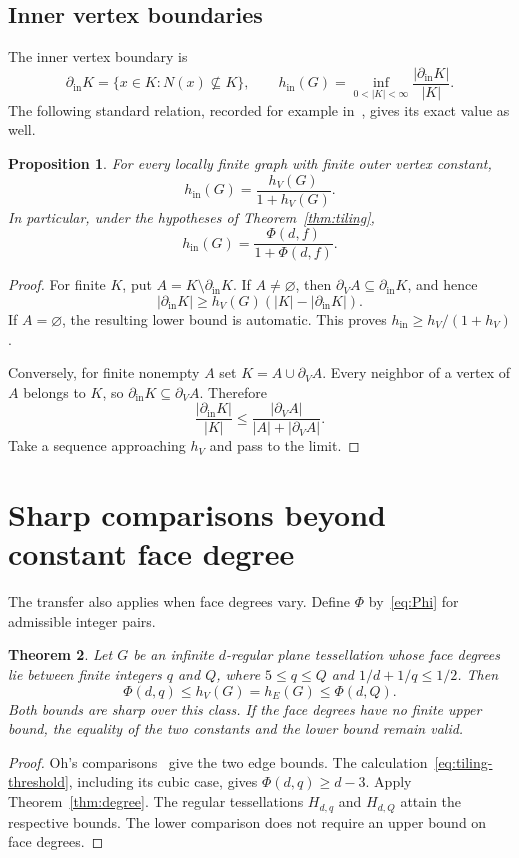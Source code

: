 \documentclass[11pt]{amsart}
\numberwithin{equation}{section}
\newtheorem{theorem}{Theorem}[section]
\newtheorem{proposition}[theorem]{Proposition}
\theoremstyle{definition}
\theoremstyle{remark}
\newcommand{\hE}{h_E}
\newcommand{\hV}{h_V}
\newcommand{\hI}{h_{\mathrm{in}}}
\newcommand{\bV}{\partial_V}
\newcommand{\bI}{\partial_{\mathrm{in}}}
\begin{document}
\subsection{Inner vertex boundaries}
The inner vertex boundary is
\[
\bI K=\{x\in K:N(x)\not\subseteq K\},\qquad
\hI(G)=\inf_{0<|K|<\infty}\frac{|\bI K|}{|K|}.
\]
The following standard relation, recorded for example in~\cite[Section~7]{Oh}, gives its exact value as well.

\begin{proposition}\label{prop:inner}
For every locally finite graph with finite outer vertex constant,
\[
\hI(G)=\frac{\hV(G)}{1+\hV(G)}.
\]
In particular, under the hypotheses of Theorem~\ref{thm:tiling},
\[
\hI(G)=\frac{\Phi(d,f)}{1+\Phi(d,f)}.
\]
\end{proposition}
\begin{proof}
For finite $K$, put $A=K\setminus\bI K$. If $A\ne\varnothing$, then $\bV A\subseteq\bI K$, and hence
\[
|\bI K|\ge\hV(G)(|K|-|\bI K|).
\]
If $A=\varnothing$, the resulting lower bound is automatic. This proves $\hI\ge\hV/(1+\hV)$.

Conversely, for finite nonempty $A$ set $K=A\cup\bV A$. Every neighbor of a vertex of $A$ belongs to $K$, so $\bI K\subseteq\bV A$. Therefore
\[
\frac{|\bI K|}{|K|}
\le\frac{|\bV A|}{|A|+|\bV A|}.
\]
Take a sequence approaching $\hV$ and pass to the limit.
\end{proof}

\section{Sharp comparisons beyond constant face degree}\label{sec:comparisons}
The transfer also applies when face degrees vary. Define $\Phi$ by~\eqref{eq:Phi} for admissible integer pairs.

\begin{theorem}\label{thm:mixed-faces}
Let $G$ be an infinite $d$-regular plane tessellation whose face degrees lie between finite integers $q$ and $Q$, where $5\le q\le Q$ and $1/d+1/q\le1/2$. Then
\begin{equation}\label{eq:mixed-face-bound}
\Phi(d,q)\le\hV(G)=\hE(G)\le\Phi(d,Q).
\end{equation}
Both bounds are sharp over this class. If the face degrees have no finite upper bound, the equality of the two constants and the lower bound remain valid.
\end{theorem}
\begin{proof}
Oh's comparisons~\cite[Theorems~3 and~4]{Oh} give the two edge bounds. The calculation~\eqref{eq:tiling-threshold}, including its cubic case, gives $\Phi(d,q)\ge d-3$. Apply Theorem~\ref{thm:degree}. The regular tessellations $H_{d,q}$ and $H_{d,Q}$ attain the respective bounds. The lower comparison does not require an upper bound on face degrees.
\end{proof}
\end{document}
